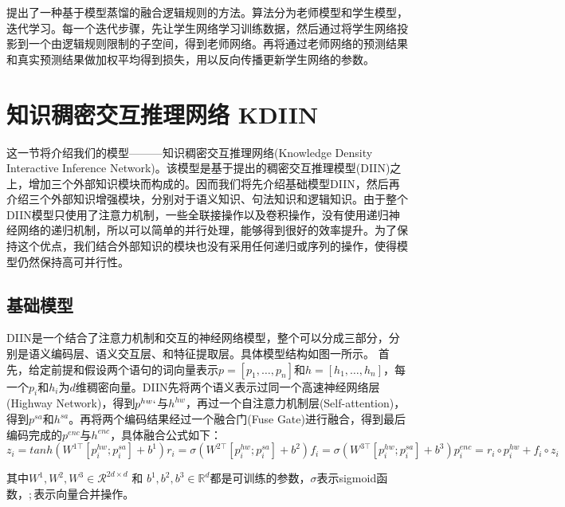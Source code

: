 \documentclass[UTF8,11pt,a4paper,nofonts]{ctexart}
\begin{document}
\cite{}提出了一种基于模型蒸馏的融合逻辑规则的方法。算法分为老师模型和学生模型，迭代学习。每一个迭代步骤，先让学生网络学习训练数据，然后通过将学生网络投影到一个由逻辑规则限制的子空间，得到老师网络。再将通过老师网络的预测结果和真实预测结果做加权平均得到损失，用以反向传播更新学生网络的参数。





\newpage
\section{知识稠密交互推理网络 KDIIN}

这一节将介绍我们的模型———知识稠密交互推理网络(Knowledge Density Interactive Inference Network)。该模型是基于\cite{}提出的稠密交互推理模型(DIIN)之上，增加三个外部知识模块而构成的。因而我们将先介绍基础模型DIIN，然后再介绍三个外部知识增强模块，分别对于语义知识、句法知识和逻辑知识。由于整个DIIN模型只使用了注意力机制，一些全联接操作以及卷积操作，没有使用递归神经网络的递归机制，所以可以简单的并行处理，能够得到很好的效率提升。为了保持这个优点，我们结合外部知识的模块也没有采用任何递归或序列的操作，使得模型仍然保持高可并行性。

\subsection{基础模型}

DIIN是一个结合了注意力机制和交互的神经网络模型，整个可以分成三部分，分别是语义编码层、语义交互层、和特征提取层。具体模型结构如图一所示。
首先，给定前提和假设两个语句的词向量表示$p=[p_1,\dots,p_n]$和$h=[h_1, \dots, h_n]$，每一个$p_i$和$h_i$为$d$维稠密向量。DIIN先将两个语义表示过同一个高速神经网络层(Highway Network)，得到$p^{hw}`$与$h^{hw}$，再过一个自注意力机制层(Self-attention)，得到$p^{sa}$和$h^{sa}$。再将两个编码结果经过一个融合门(Fuse Gate)进行融合，得到最后编码完成的$p^{enc}$与$h^{enc}$，具体融合公式如下：
\begin{equation}
z_i = tanh(W^{1\top}[p^{hw}_i;p^{sa}_i]+b^1)

r_i = \sigma(W^{2\top}[p^{hw}_i;p^{sa}_i]+b^2)

f_i = \sigma(W^{3\top}[p^{hw}_i;p^{sa}_i]+b^3)

p^{enc}_i = r_i \circ p^{hw}_i + f_i \circ z_i
\end{equation}

其中$W^1, W^2, W^3 \in \mathcal{R}^{2d\times d}$ 和 $b^1, b^2, b^3 \in \mathbb{R}^d$都是可训练的参数，$\sigma$表示sigmoid函数，$;$表示向量合并操作。
\end{document}
